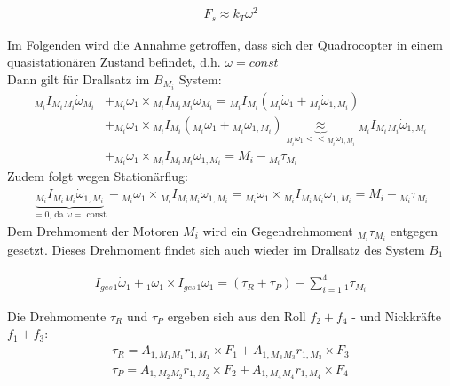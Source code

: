 \begin{align}\label{gl:schub}
    F_s \approx k_{T} \omega^2 
\end{align}

Im Folgenden wird die Annahme getroffen, dass sich der Quadrocopter in einem quasistationären Zustand befindet, d.h. $\omega = const$\\

Dann gilt für Drallsatz im $B_{M_i}$ System: 
\begin{align}
    {_{M_i} I_{M_i}} {_{M_i} \dot{\omega}_{M_i}} &+ {_{M_i} {\omega}_{1}} \times {_{M_i} I_{M_i}} {_{M_i} {\omega}_{M_i}} = {_{M_i} I_{M_i}} \left({_{M_i} \dot{\omega}_{1}} + {_{M_i} \dot{\omega}_{1, M_i}}\right) \\
    &+ {_{M_i} {\omega}_{1}} \times {_{M_i} I_{M_i}} \left({_{M_i} {\omega}_{1}} + {_{M_i} {\omega}_{1, M_i}} \right) \underbrace{\approx}_{{_{M_i} {\omega}_{1}} << {_{M_i} {\omega}_{1, M_i}}} {_{M_i} I_{M_i}} {_{M_i} \dot{\omega}_{1,M_i}} \\
    &+ {_{M_i} {\omega}_{1}} \times {_{M_i} I_{M_i}} {_{M_i} {\omega}_{1, M_i}} = M_i - {_{M_i} \tau_{M_i}}
\end{align}
Zudem folgt wegen Stationärflug:
\begin{align}
    \underbrace{{_{M_i} I_{M_i}} {_{M_i} \dot{\omega}_{1, M_i}}}_{=0\text{, da }\omega =\text{ const}} + {_{M_i} {\omega}_{1}} \times {_{M_i} I_{M_i}} {_{M_i} {\omega}_{1, M_i}} = {_{M_i} {\omega}_{1}} \times {_{M_i} I_{M_i}} {_{M_i} {\omega}_{1, M_i}} =  M_i - {_{M_i} \tau_{M_i}} 
\end{align}
Dem Drehmoment der Motoren $M_i$ wird ein Gegendrehmoment ${_{M_i}\tau_{M_i}}$ entgegen gesetzt. Dieses Drehmoment findet sich auch wieder im Drallsatz des System $B_{1}$

\begin{align}
    I_{ges} {_{1} \dot{\omega}_{1}} + {_{1} {\omega}_{1}} \times I_{ges} {_{1} {\omega}_{1}} = (\tau_{R} + \tau_{P}) -\sum_{i = 1}^{4} {_{1} \tau_{M_i}} 
\end{align}

Die Drehmomente $\tau_R$ und $\tau_P$ ergeben sich aus den Roll $f_2 + f_4$ - und Nickkräfte $f_1 + f_3$: 
\begin{align}
    \tau_R = A_{1, M_1} {_{M_1}r_{1, M_1}} \times F_1  +  A_{1, M_3} {_{M_3}r_{1, M_3}} \times F_3 \\
    \tau_P = A_{1, M_2} {_{M_2}r_{1, M_2}} \times F_2  +  A_{1, M_4} {_{M_4}r_{1, M_4}} \times F_4
\end{align}

